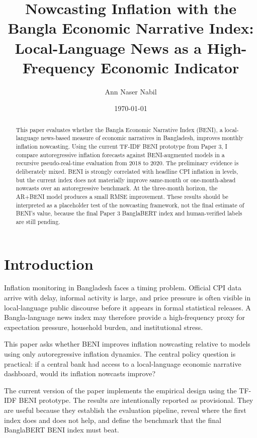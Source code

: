 \documentclass[11pt]{article}
\title{Nowcasting Inflation with the Bangla Economic Narrative Index:\\ Local-Language News as a High-Frequency Economic Indicator}
\author{Ann Naser Nabil}
\date{\today}
\begin{document}
\maketitle

\begin{abstract}
This paper evaluates whether the Bangla Economic Narrative Index (BENI), a local-language news-based measure of economic narratives in Bangladesh, improves monthly inflation nowcasting. Using the current TF-IDF BENI prototype from Paper 3, I compare autoregressive inflation forecasts against BENI-augmented models in a recursive pseudo-real-time evaluation from 2018 to 2020. The preliminary evidence is deliberately mixed. BENI is strongly correlated with headline CPI inflation in levels, but the current index does not materially improve same-month or one-month-ahead nowcasts over an autoregressive benchmark. At the three-month horizon, the AR+BENI model produces a small RMSE improvement. These results should be interpreted as a placeholder test of the nowcasting framework, not the final estimate of BENI's value, because the final Paper 3 BanglaBERT index and human-verified labels are still pending.
\end{abstract}

\section{Introduction}

Inflation monitoring in Bangladesh faces a timing problem. Official CPI data arrive with delay, informal activity is large, and price pressure is often visible in local-language public discourse before it appears in formal statistical releases. A Bangla-language news index may therefore provide a high-frequency proxy for expectation pressure, household burden, and institutional stress.

This paper asks whether BENI improves inflation nowcasting relative to models using only autoregressive inflation dynamics. The central policy question is practical: if a central bank had access to a local-language economic narrative dashboard, would its inflation nowcasts improve?

The current version of the paper implements the empirical design using the TF-IDF BENI prototype. The results are intentionally reported as provisional. They are useful because they establish the evaluation pipeline, reveal where the first index does and does not help, and define the benchmark that the final BanglaBERT BENI index must beat.
\end{document}
